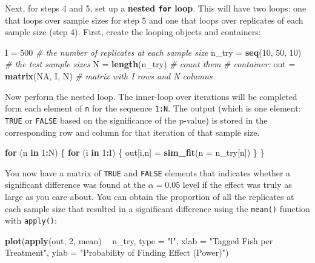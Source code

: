 \documentclass[]{book}
\newenvironment{Shaded}{\begin{snugshade}}{\end{snugshade}}
\newcommand{\KeywordTok}[1]{\textcolor[rgb]{0.13,0.29,0.53}{\textbf{#1}}}
\newcommand{\DataTypeTok}[1]{\textcolor[rgb]{0.13,0.29,0.53}{#1}}
\newcommand{\DecValTok}[1]{\textcolor[rgb]{0.00,0.00,0.81}{#1}}
\newcommand{\StringTok}[1]{\textcolor[rgb]{0.31,0.60,0.02}{#1}}
\newcommand{\CommentTok}[1]{\textcolor[rgb]{0.56,0.35,0.01}{\textit{#1}}}
\newcommand{\OtherTok}[1]{\textcolor[rgb]{0.56,0.35,0.01}{#1}}
\newcommand{\ControlFlowTok}[1]{\textcolor[rgb]{0.13,0.29,0.53}{\textbf{#1}}}
\newcommand{\OperatorTok}[1]{\textcolor[rgb]{0.81,0.36,0.00}{\textbf{#1}}}
\newcommand{\NormalTok}[1]{#1}
\theoremstyle{definition}
\theoremstyle{definition}
\theoremstyle{definition}
\theoremstyle{remark}
\begin{document}
Next, for steps 4 and 5, set up a \textbf{nested \texttt{for} loop}.
This will have two loops: one that loops over sample sizes for step 5
and one that loops over replicates of each sample size (step 4). First,
create the looping objects and containers:

\begin{Shaded}
\begin{Highlighting}[]
\NormalTok{I =}\StringTok{ }\DecValTok{500}  \CommentTok{# the number of replicates at each sample size}
\NormalTok{n_try =}\StringTok{ }\KeywordTok{seq}\NormalTok{(}\DecValTok{10}\NormalTok{, }\DecValTok{50}\NormalTok{, }\DecValTok{10}\NormalTok{)  }\CommentTok{# the test sample sizes}
\NormalTok{N =}\StringTok{ }\KeywordTok{length}\NormalTok{(n_try)        }\CommentTok{# count them}
\CommentTok{# container: }
\NormalTok{out =}\StringTok{ }\KeywordTok{matrix}\NormalTok{(}\OtherTok{NA}\NormalTok{, I, N) }\CommentTok{# matrix with I rows and N columns}
\end{Highlighting}
\end{Shaded}

Now perform the nested loop. The inner-loop over iterations will be
completed form each element of \texttt{n} for the sequence \texttt{1:N}.
The output (which is one element: \texttt{TRUE} or \texttt{FALSE} based
on the significance of the p-value) is stored in the corresponding row
and column for that iteration of that sample size.

\begin{Shaded}
\begin{Highlighting}[]
\ControlFlowTok{for}\NormalTok{ (n }\ControlFlowTok{in} \DecValTok{1}\OperatorTok{:}\NormalTok{N) \{}
  \ControlFlowTok{for}\NormalTok{ (i }\ControlFlowTok{in} \DecValTok{1}\OperatorTok{:}\NormalTok{I) \{}
\NormalTok{    out[i,n] =}\StringTok{ }\KeywordTok{sim_fit}\NormalTok{(}\DataTypeTok{n =}\NormalTok{ n_try[n])}
\NormalTok{  \}}
\NormalTok{\}}
\end{Highlighting}
\end{Shaded}

You now have a matrix of \texttt{TRUE} and \texttt{FALSE} elements that
indicates whether a significant difference was found at the
\(\alpha = 0.05\) level if the effect was truly as large as you care
about. You can obtain the proportion of all the replicates at each
sample size that resulted in a significant difference using the
\texttt{mean()} function with \texttt{apply()}:

\begin{Shaded}
\begin{Highlighting}[]
\KeywordTok{plot}\NormalTok{(}\KeywordTok{apply}\NormalTok{(out, }\DecValTok{2}\NormalTok{, mean) }\OperatorTok{~}\StringTok{ }\NormalTok{n_try, }\DataTypeTok{type =} \StringTok{"l"}\NormalTok{,}
     \DataTypeTok{xlab =} \StringTok{"Tagged Fish per Treatment"}\NormalTok{,}
     \DataTypeTok{ylab =} \StringTok{"Probability of Finding Effect (Power)"}\NormalTok{)}
\end{Highlighting}
\end{Shaded}
\end{document}

